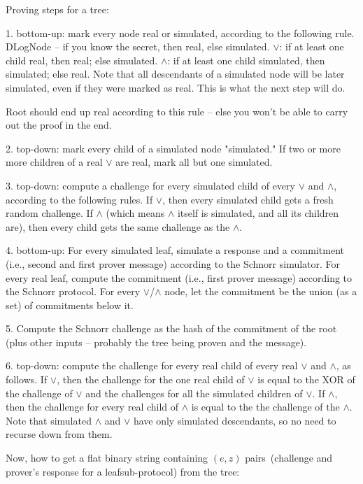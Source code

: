 \documentclass[]{article}   %
\newcommand{\authnote}[2]{\marginpar{\parbox{\marginparwidth}{\tiny %
  \textsf{#1 {\textcolor{blue}{notes: #2}}}}}%
  \textcolor{blue}{\textbf{\dag}}}
\newcommand{\authnote}[2]{
  \textsf{#1 \textcolor{blue}{: #2}}}
\newcommand{\authnote}[2]{}
\newcommand{\knote}[1]{{\authnote{\textcolor{green}{Alex notes}}{#1}}}
\begin{document}
Proving steps for a tree:

\knote{text below is duplicated in Sigma paper, also this is a raw text copypasted from an email}


    1. bottom-up: mark every node real or simulated, according to the following rule. DLogNode -- if you know the secret,
     then real, else simulated. $\lor$: if at least one child real, then real; else simulated. $\land$: if at least one child
     simulated, then simulated; else real. Note that all descendants of a simulated node will be later simulated, even
     if they were marked as real. This is what the next step will do.

     Root should end up real according to this rule -- else you won't be able to carry out the proof in the end.

    2. top-down: mark every child of a simulated node "simulated." If two or more more children of a real $\lor$ are real,
     mark all but one simulated.

    3. top-down: compute a challenge for every simulated child of every $\lor$ and $\land$, according to the following rules.
     If $\lor$, then every simulated child gets a fresh random challenge. If $\land$ (which means $\land$ itself is simulated, and
     all its children are), then every child gets the same challenge as the $\land$.

    4. bottom-up: For every simulated leaf, simulate a response and a commitment (i.e., second and first prover message)
     according to the Schnorr simulator. For every real leaf, compute the commitment (i.e., first prover message) according
     to the Schnorr protocol. For every $\lor$/$\land$ node, let the commitment be the union (as a set) of commitments below it.

    5. Compute the Schnorr challenge as the hash of the commitment of the root (plus other inputs -- probably the tree
     being proven and the message).

    6. top-down: compute the challenge for every real child of every real $\lor$ and $\land$, as follows. If $\lor$, then the
     challenge for the one real child of $\lor$ is equal to the XOR of the challenge of $\lor$ and the challenges for all the
     simulated children of $\lor$. If $\land$, then the challenge for every real child of $\land$ is equal to the the challenge of
     the $\land$. Note that simulated $\land$ and $\lor$ have only simulated descendants, so no need to recurse down from them.


Now, how to get a flat binary string containing $(e, z)$ pairs~(challenge and prover's response for a leafsub-protocol)
from the tree:
\end{document}
